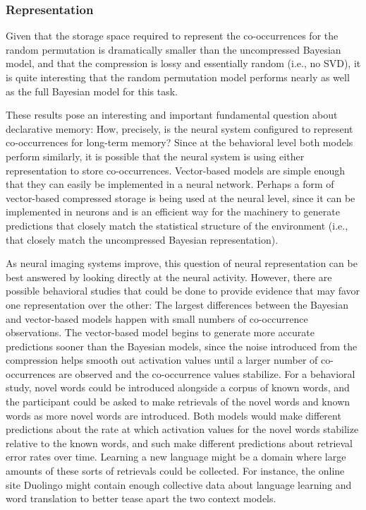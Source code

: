 \documentclass[man,floatsintext,donotrepeattitle]{apa6}
\begin{document}
\subsubsection{Representation}

Given that the storage space required to represent the co-occurrences for the random permutation is dramatically smaller than the uncompressed Bayesian model,
and that the compression is lossy and essentially random (i.e., no SVD),
it is quite interesting that the random permutation model performs nearly as well as the full Bayesian model for this task.

These results pose an interesting and important fundamental question about declarative memory:
How, precisely, is the neural system configured to represent co-occurrences for long-term memory?
Since at the behavioral level both models perform similarly, it is possible that the neural system is using either representation to store co-occurrences.
Vector-based models are simple enough that they can easily be implemented in a neural network.
Perhaps a form of vector-based compressed storage is being used at the neural level,
since it can be implemented in neurons and is an efficient way for the machinery to generate predictions that closely match the statistical structure of the environment
(i.e., that closely match the uncompressed Bayesian representation).

As neural imaging systems improve, this question of neural representation can be best answered by looking directly at the neural activity.
However, there are possible behavioral studies that could be done to provide evidence that may favor one representation over the other:
The largest differences between the Bayesian and vector-based models happen with small numbers of co-occurrence observations.
The vector-based model begins to generate more accurate predictions sooner than the Bayesian models,
since the noise introduced from the compression helps smooth out activation values until a larger number of co-occurrences are observed and the co-occurrence values stabilize.
For a behavioral study, novel words could be introduced alongside a corpus of known words, and the participant could be asked to make retrievals of the novel words and known words as more novel words are introduced.
Both models would make different predictions about the rate at which activation values for the novel words stabilize relative to the known words, and such make different predictions about retrieval error rates over time.
Learning a new language might be a domain where large amounts of these sorts of retrievals could be collected.
For instance, the online site Duolingo might contain enough collective data about language learning and word translation to better tease apart the two context models.
\end{document}
